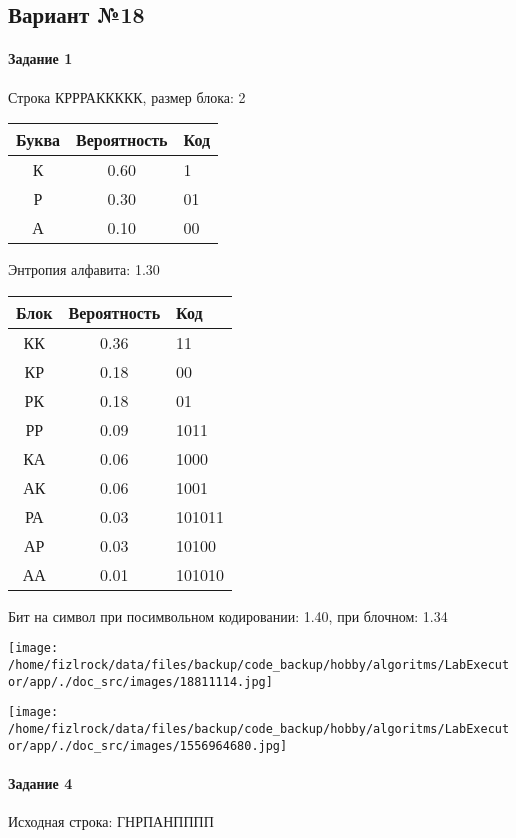 \documentclass[a4paper, 12pt]{article}
\begin{document}
\subsection{Вариант №18}
\paragraph{Задание 1}

Строка КРРРАККККК, размер блока: 2
\begin{center}
 \begin{tabular}{ |c|c|l| } 
  \hline
     Буква & Вероятность & Код\\ \hline
К & 0.60 & 1\\\hline
Р & 0.30 & 01\\\hline
А & 0.10 & 00
\\ \hline \end{tabular}
\end{center}
Энтропия алфавита: 1.30
\begin{center}
 \begin{tabular}{ |c|c|l| } 
  \hline
     Блок & Вероятность & Код\\ \hline
КК & 0.36 & 11\\\hline
КР & 0.18 & 00\\\hline
РК & 0.18 & 01\\\hline
РР & 0.09 & 1011\\\hline
КА & 0.06 & 1000\\\hline
АК & 0.06 & 1001\\\hline
РА & 0.03 & 101011\\\hline
АР & 0.03 & 10100\\\hline
АА & 0.01 & 101010
\\ \hline \end{tabular}
\end{center}
Бит на символ при посимвольном кодировании: 1.40, при блочном: 1.34

\texttt{[image: /home/fizlrock/data/files/backup/code\_backup/hobby/algoritms/LabExecutor/app/./doc\_src/images/18811114.jpg]}

\texttt{[image: /home/fizlrock/data/files/backup/code\_backup/hobby/algoritms/LabExecutor/app/./doc\_src/images/1556964680.jpg]}
\paragraph{Задание 4}


Исходная строка: ГНРПАНПППП
\end{document}

